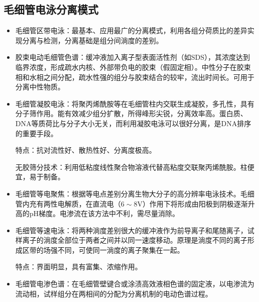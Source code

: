 \subsection{毛细管电泳分离模式}
\begin{itemize}
	\item 毛细管区带电泳：最基本、应用最广的分离模式，利用各组分荷质比的差异实现分离与检测，分离基础是组分间淌度的差别。
	\item 胶束电动毛细管色谱：缓冲液加入离子型表面活性剂（如SDS），其浓度达到临界浓度，形成疏水内核、外部带负电的胶束（假固定相）。中性分子在胶束相和水相之间分配，疏水性强的组分与胶束结合的较牢，流出时间长。可用于分离中性物质。
	\item 毛细管凝胶电泳：将聚丙烯酰胺等在毛细管柱内交联生成凝胶，多孔性，具有分子筛作用。能有效减少组分扩散，所得峰形尖锐，分离效率高。蛋白质、DNA等质荷比与分子大小无关，而利用凝胶电泳可以很好分离，是DNA排序的重要手段。
	
	特点：抗对流性好、散热性好、分离度极高。
	
	无胶筛分技术：利用低粘度线性聚合物溶液代替高粘度交联聚丙烯酰胺。柱便宜，易于制备。
	\item 毛细管等电聚焦：根据等电点差别分离生物大分子的高分辨率电泳技术。毛细管内充有两性电解质，在直流电（$6\sim 8\mathrm{V}$）作用下将形成由阳极到阴极逐渐升高的pH梯度。电渗流在该方法中不利，需尽量消除。
	\item 毛细管等速电泳：将两种淌度差别很大的缓冲液作为前导离子和尾随离子，试样离子的淌度全部位于两者之间并以同一速度移动。原理是淌度不同的离子形成区带的场强不同，可使同一淌度的离子聚集在一起。
	
	特点：界面明显，具有富集、浓缩作用。
	\item 毛细管电渗色谱：在毛细管壁键合或涂渍高效液相色谱的固定液，以电渗流为流动相，试样组分在两相间的分配为分离机制的电动色谱过程。
\end{itemize}